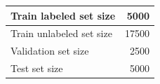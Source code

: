 \begin{tabular}{L{\WWW}  R{\RRR}}
\\ \hline
Train labeled set size & 5000
\\ \hline
Train unlabeled set size & 17500
\\ \hline
Validation set size & 2500
\\ \hline
Test set size & 5000
\end{tabular}